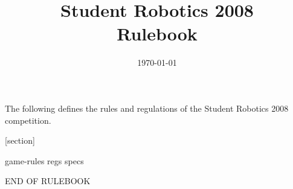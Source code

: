 \documentclass[a4paper, 12pt]{article}
\title {Student Robotics 2008\\ Rulebook}
\date{\today}
\begin{document}
\maketitle

\noindent The following defines the rules and regulations of the Student Robotics 2008 competition.

[section]
\newcommand{\rcn}{\stepcounter{rule}\arabic{section}.\arabic{rule}}
\renewcommand{\labelenumi}{\rcn}

 {game-rules}
\newpage
 {regs}
\newpage
 {specs}

\begin{center}
END OF RULEBOOK
\end{center}
\end{document}
